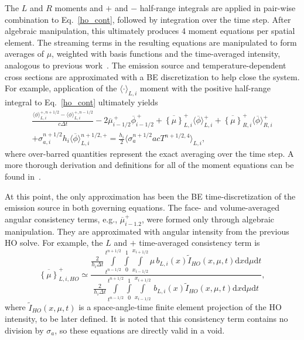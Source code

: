 \documentclass{anstrans}
\newcommand{\mom}[1]{\langle #1 \rangle}
\newcommand{\xl}{{x_{i-1/2}}}
\newcommand{\xr}{{x_{i+1/2}}}
\newcommand{\dd}{\ensuremath{\mathrm{d}}}
\newcommand{\phibar}{\ensuremath{\overline{\phi}}}
\newcommand{\cur}[1]{\left\{ #1 \right\}}
\newcommand{\ds}[0]{\displaystyle}
\begin{document}
The $L$ and $R$ moments and $+$ and $-$ half-range integrals are applied in pair-wise combination to
Eq.~\eqref{ho_cont}, followed by integration over the time step.  After algebraic manipulation, this
ultimately produces 4 moment equations per spatial element.  The streaming terms 
in the resulting equations are manipulated to form averages of $\mu$, weighted with basis functions
and the time-averaged intensity, analogous to previous work~\cite{bolding_nse,wolters}. 
The emission source and temperature-dependent cross sections are approximated with a BE discretization to help close the system.
For example, application of the $\mom{\cdot}_{L,i}$ moment with the positive half-range integral to
Eq.~\eqref{ho_cont} ultimately yields
\begin{multline}\label{eq:t_moml_ex}
    \frac{\mom{\phi}_{L,i}^{+,n+1/2} - \mom{\phi}_{L,i}^{+,n-1/2}}{c \Delta t}
    -2\overline {\mu}_{i-1/2}^{\,+} \overline \phi_{i-1/2}^{\,+} + \overline{\cur {\mu}}_{L,i}^{+}
  \mom{\phibar}_{L,i}^{+}
  +  \overline{\cur\mu}_{R,i}^{+}
  \mom{\phibar}_{R,i}^{+} \\+  \sigma_{a,i}^{n+1/2} h_i 
  \mom{\overline\phi}_{L,i}^{n+1/2,+}  = \frac{h_i}{2} \mom{\sigma_a^{n+1/2} a c T^{n+1/2,4}}_{L,i},
\end{multline}
where over-barred quantities represent the exact averaging over the time step.
A more thorough derivation and definitions for all of the  moment equations can be found in~\cite{dissertation}.

At this point, the only approximation has been the BE time-discretization of the emission source in
both governing equations. 
The face- and volume-averaged angular consistency terms, e.g., $\overline{\mu}_{i-1.2}^+$, were
formed only through algebraic manipulation.   They are approximated with angular intensity from the
previous HO solve.
For example, the $L$ and $+$ time-averaged consistency term is
\begin{equation}\label{eq:cons}
    \overline{\cur{{\mu}}}_{L,i,HO}^{+} \simeq  \frac{\ds 
        {\displaystyle \frac{2}{h_i\Delta t}} \int\limits_{t^{n-1/2}}^{t^{n+1/2}} \int\limits_0^1 \int\limits_\xl^\xr \mu \, b_{L,i}(x)
\tilde I_{HO}(x,\mu,t) \dd x \dd \mu \dd t } 
{\ds {\displaystyle \frac{2}{h_i \Delta t}}\int\limits_{t^{n-1/2}}^{t^{n+1/2}} \int\limits_0^1 \int\limits_\xl^\xr \, b_{L,i}(x)
\tilde I_{HO}(x,\mu,t) \dd x \dd \mu \dd t },
\end{equation}
where $\tilde I_{HO}(x,\mu,t)$ is a space-angle-time finite element projection of the HO intensity,
to be later defined. It is noted that this consistency term contains no division by $\sigma_a$, so
these equations are directly valid in a void.
\end{document}
